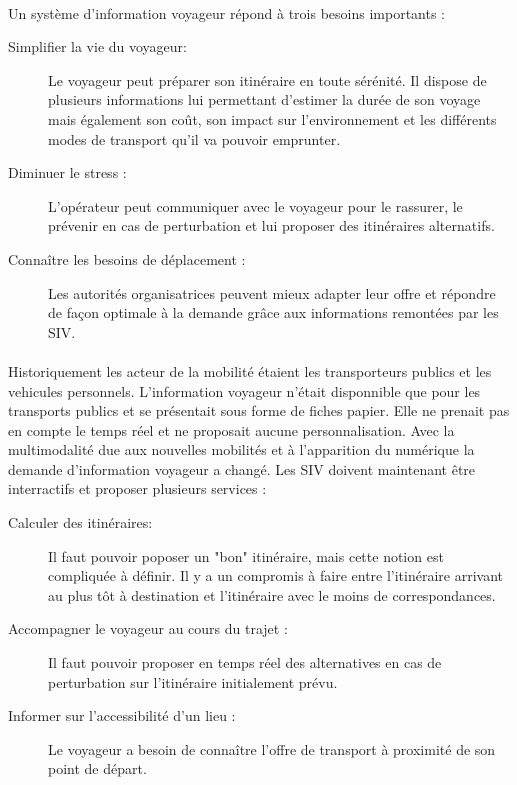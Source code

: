 \documentclass[a4paper]{report}
\begin{document}
\paragraph{} Un système d'information voyageur répond à trois besoins importants : 
				
\begin{description}
	\item[Simplifier la vie du voyageur:] Le voyageur peut préparer son itinéraire en toute sérénité. Il dispose de plusieurs informations lui permettant d'estimer la durée de son voyage mais également son coût, son impact sur l'environnement et les différents modes de transport qu'il va pouvoir emprunter.
	\item[Diminuer le stress :] L'opérateur peut communiquer avec le voyageur pour le rassurer, le prévenir en cas de perturbation et lui proposer des itinéraires alternatifs.
	\item[Connaître les besoins de déplacement :] Les autorités organisatrices peuvent mieux adapter leur offre et répondre de façon optimale à la demande grâce aux informations remontées par les SIV.
\end{description}

\paragraph{} Historiquement les acteur de la mobilité étaient les transporteurs publics et les vehicules personnels. L'information voyageur n'était disponnible que pour les transports publics et se présentait sous forme de fiches papier. Elle ne prenait pas en compte le temps réel et ne proposait aucune personnalisation. Avec la multimodalité due aux nouvelles mobilités et à l'apparition du numérique la demande d'information voyageur a changé. Les SIV doivent maintenant être interractifs et proposer plusieurs services :
				
\begin{description}
	\item[Calculer des itinéraires:]  Il faut pouvoir poposer un "bon" itinéraire, mais cette notion est compliquée à définir. Il y a un compromis à faire entre l'itinéraire arrivant au plus tôt à destination et l'itinéraire avec le moins de correspondances.
	\item[Accompagner le voyageur au cours du trajet :] Il faut pouvoir proposer en temps réel des alternatives en cas de perturbation sur l'itinéraire initialement prévu.
	\item[Informer sur l'accessibilité d'un lieu :] Le voyageur a besoin de connaître l'offre de transport à proximité de son point de départ.
\end{description}
\end{document}
